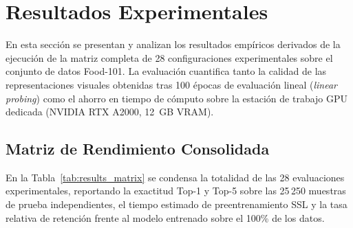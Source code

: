 \section{Resultados Experimentales}
\label{sec:results}

En esta sección se presentan y analizan los resultados empíricos derivados de la ejecución de la matriz completa de 28 configuraciones experimentales sobre el conjunto de datos Food-101. La evaluación cuantifica tanto la calidad de las representaciones visuales obtenidas tras 100 épocas de evaluación lineal (\textit{linear probing}) como el ahorro en tiempo de cómputo sobre la estación de trabajo GPU dedicada (NVIDIA RTX A2000, 12~GB VRAM).

\subsection{Matriz de Rendimiento Consolidada}
En la Tabla~\ref{tab:results_matrix} se condensa la totalidad de las 28 evaluaciones experimentales, reportando la exactitud Top-1 y Top-5 sobre las 25\,250 muestras de prueba independientes, el tiempo estimado de preentrenamiento SSL y la tasa relativa de retención frente al modelo entrenado sobre el 100\% de los datos.

